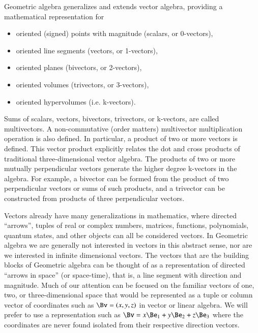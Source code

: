 Geometric algebra generalizes and extends vector algebra, providing a mathematical representation for

\begin{itemize}
\item
oriented (signed) points with magnitude (scalars, or 0-vectors),
\item
oriented line segments (vectors, or 1-vectors),
\item
oriented planes (bivectors, or 2-vectors),
\item
oriented volumes (trivectors, or 3-vectors),
\item
oriented hypervolumes (i.e. k-vectors).
\end{itemize}

Sums of scalars, vectors, bivectors, trivectors, or k-vectors, are called multivectors.
A non-commutative (order matters) multivector multiplication operation is also defined.
In particular, a product of two or more vectors is defined.  This vector product explicitly
relates the dot and cross products of traditional three-dimensional vector algebra.
The products of two or more mutually perpendicular vectors generate the higher degree k-vectors in the algebra.
For example, a bivector can be formed from the product of
two perpendicular vectors or sums of such products, and a trivector can be constructed from products of three perpendicular vectors.

Vectors already have many generalizations in mathematics, where directed ``arrows'', tuples of real or complex numbers, matrices, functions, polynomials, quantum states, and other objects can all be considered vectors.
In Geometric algebra we are generally not interested in vectors in this abstract sense,
nor are we interested in infinite dimensional vectors.
The vectors that are the building blocks of Geometric algebra can be thought of as a representation of directed ``arrows in space'' (or space-time), that is, a line segment with direction and magnitude.
Much of our attention can be focused on the familiar vectors of one, two, or three-dimensional space that would be represented as a tuple or column vector of coordinates such as \( \Bv = (x, y, z)\) in vector or linear algebra.
We will prefer to use a representation such as \( \Bv = x \Be_1 + y \Be_2 + z \Be_3 \) where the coordinates are never found isolated from their respective direction vectors.

